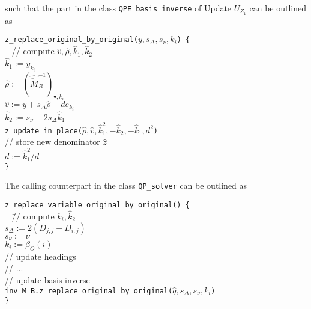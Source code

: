 \documentclass[a4paper]{article}
\begin{document}
such that the part in the class \texttt{QPE\_basis\_inverse} of 
Update $U_{Z_{1}}$ can be outlined as
\begin{tabbing}
\texttt{z\_replace\_original\_by\_original($y, s_{\Delta}, s_{\nu}, k_{i}$) \{}
\\
\texttt{  } \= // compute $\hat{v}, \hat{\rho}, \hat{k}_{1}, \hat{k}_{2}$ \\
\> \texttt{$\hat{k}_{1}:=y_{k_{i}}$} \\
\> \texttt{$\hat{\rho}:=
  \left(\hat{\check{M}}_{B}^{-1}\right)_{\bullet, k_{i}}$} \\
\> \texttt{$\hat{v}:=y + s_{\Delta} \hat{\rho} - de_{k_{i}}$} \\
\> \texttt{$\hat{k}_{2}:=s_{\nu} - 2s_{\Delta}\hat{k}_{1}$} \\
\> \texttt{z\_update\_in\_place($\hat{\rho}, \hat{v}, \hat{k}_{1}^{2},
-\hat{k}_{2}, -\hat{k}_{1}, d^{2}$)} \\
\> // store new denominator $\hat{z}$ \\
\> \texttt{$d:=\hat{k}_{1}^{2}/d$} \\
\texttt{\}}
\end{tabbing}
The calling counterpart in the class \texttt{QP\_solver} can be outlined as
\begin{tabbing}
\texttt{z\_replace\_variable\_original\_by\_original() \{} \\
\texttt{  } \= // compute $k_{i}, \hat{k}_{2}$ \\
\> \texttt{$s_{\Delta}:= 2\left(D_{j,j} - D_{i,j}\right)$} \\
\> \texttt{$s_{\nu}:= \nu$} \\
\> \texttt{$k_{i}:=\beta_{O}(i)$} \\
\> // update headings \\
\> // ... \\
\> // update basis inverse \\
\> \texttt{inv\_M\_B.z\_replace\_original\_by\_original($\hat{q},
s_{\Delta}, s_{\nu}, k_{i}$)} \\
\texttt{\}}
\end{tabbing}
\end{document}
